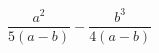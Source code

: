 \begin{ex}
	\begin{condition}
		\( \dfrac{a^2}{5(a-b)}-\dfrac{b^3}{4(a-b)} \)
	\end{condition}
\end{ex}